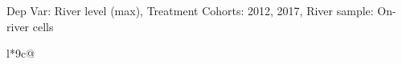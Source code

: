 \begin{table}[H]
\captionlistentry[table]{}
\label{table:beaver_hydrometry_DVlevel_max_SCg12}
\tiny %
Dep Var: River level (max), Treatment Cohorts: 2012, 2017, River sample: On-river cells \\
\begin{threeparttable}
\begin{tabulary}{\textwidth}{l*{9}{c}@{}}
\toprule \toprule
\noalign{\smallskip}
\noalign{\smallskip}
\midrule \bottomrule
\end{tabulary}
\medskip
\end{threeparttable}
\end{table}
